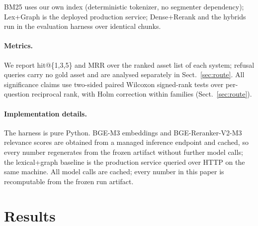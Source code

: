 \documentclass[runningheads]{llncs}
\begin{document}
BM25 uses our own index (deterministic tokenizer, no segmenter dependency);
Lex+Graph is the deployed production service; Dense+Rerank and the hybrids run
in the evaluation harness over identical chunks.

\paragraph{Metrics.} We report hit@\{1,3,5\} and MRR over the ranked asset
list of each system; refusal queries carry no gold asset and are analysed
separately in Sect.~\ref{sec:route}. All significance claims use two-sided
paired Wilcoxon signed-rank tests over per-question reciprocal rank, with
Holm correction within families (Sect.~\ref{sec:route}).

\paragraph{Implementation details.} The harness is pure Python. BGE-M3
embeddings and BGE-Reranker-V2-M3 relevance scores are obtained from a
managed inference endpoint and cached, so every number regenerates from the
frozen artifact without further model calls; the lexical+graph baseline is
the production service queried over HTTP on the same machine. All model calls are cached;
every number in this paper is recomputable from the frozen run artifact.

\section{Results}
\label{sec:results}
\end{document}
